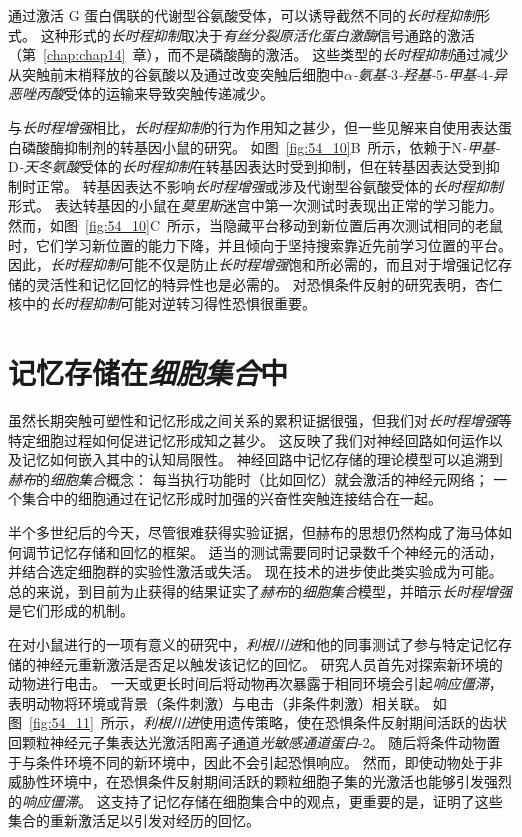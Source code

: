 通过激活 G 蛋白偶联的代谢型谷氨酸受体，可以诱导截然不同的\textit{长时程抑制}形式。
这种形式的\textit{长时程抑制}取决于\textit{\textit{有丝分裂原活化蛋白激酶}}信号通路的激活（第~\ref{chap:chap14}~章），而不是磷酸酶的激活。
这些类型的\textit{长时程抑制}通过减少从突触前末梢释放的谷氨酸以及通过改变突触后细胞中\textit{$\alpha$-氨基-}3\textit{-羟基-}5\textit{-甲基-}4\textit{-异恶唑丙酸}受体的运输来导致突触传递减少。


与\textit{长时程增强}相比，\textit{长时程抑制}的行为作用知之甚少，但一些见解来自使用表达蛋白磷酸酶抑制剂的转基因小鼠的研究。
如图~\ref{fig:54_10}B~所示，依赖于N\textit{-甲基-}D\textit{-天冬氨酸}受体的\textit{长时程抑制}在转基因表达时受到抑制，但在转基因表达受到抑制时正常。
转基因表达不影响\textit{长时程增强}或涉及代谢型谷氨酸受体的\textit{长时程抑制}形式。
表达转基因的小鼠在\textit{莫里斯}迷宫中第一次测试时表现出正常的学习能力。
然而，如图~\ref{fig:54_10}C~所示，当隐藏平台移动到新位置后再次测试相同的老鼠时，它们学习新位置的能力下降，并且倾向于坚持搜索靠近先前学习位置的平台。
因此，\textit{长时程抑制}可能不仅是防止\textit{长时程增强}饱和所必需的，而且对于增强记忆存储的灵活性和记忆回忆的特异性也是必需的。
对恐惧条件反射的研究表明，杏仁核中的\textit{长时程抑制}可能对逆转习得性恐惧很重要。



\section{记忆存储在\textit{细胞集合}中}

虽然长期突触可塑性和记忆形成之间关系的累积证据很强，但我们对\textit{长时程增强}等特定细胞过程如何促进记忆形成知之甚少。
这反映了我们对神经回路如何运作以及记忆如何嵌入其中的认知局限性。
神经回路中记忆存储的理论模型可以追溯到\textit{赫布}的\textit{细胞集合}概念：
每当执行功能时（比如回忆）就会激活的神经元网络；
一个集合中的细胞通过在记忆形成时加强的兴奋性突触连接结合在一起。


半个多世纪后的今天，尽管很难获得实验证据，但赫布的思想仍然构成了海马体如何调节记忆存储和回忆的框架。
适当的测试需要同时记录数千个神经元的活动，并结合选定细胞群的实验性激活或失活。
现在技术的进步使此类实验成为可能。
总的来说，到目前为止获得的结果证实了\textit{赫布}的\textit{细胞集合}模型，并暗示\textit{长时程增强}是它们形成的机制。


在对小鼠进行的一项有意义的研究中，\textit{利根川进}和他的同事测试了参与特定记忆存储的神经元重新激活是否足以触发该记忆的回忆。
研究人员首先对探索新环境的动物进行电击。
一天或更长时间后将动物再次暴露于相同环境会引起\textit{响应僵滞}，表明动物将环境或背景（条件刺激）与电击（非条件刺激）相关联。
如图~\ref{fig:54_11}~所示，\textit{利根川进}使用遗传策略，使在恐惧条件反射期间活跃的齿状回颗粒神经元子集表达光激活阳离子通道\textit{光敏感通道蛋白}-2。
随后将条件动物置于与条件环境不同的新环境中，因此不会引起恐惧响应。
然而，即使动物处于非威胁性环境中，在恐惧条件反射期间活跃的颗粒细胞子集的光激活也能够引发强烈的\textit{响应僵滞}。
这支持了记忆存储在细胞集合中的观点，更重要的是，证明了这些集合的重新激活足以引发对经历的回忆。


